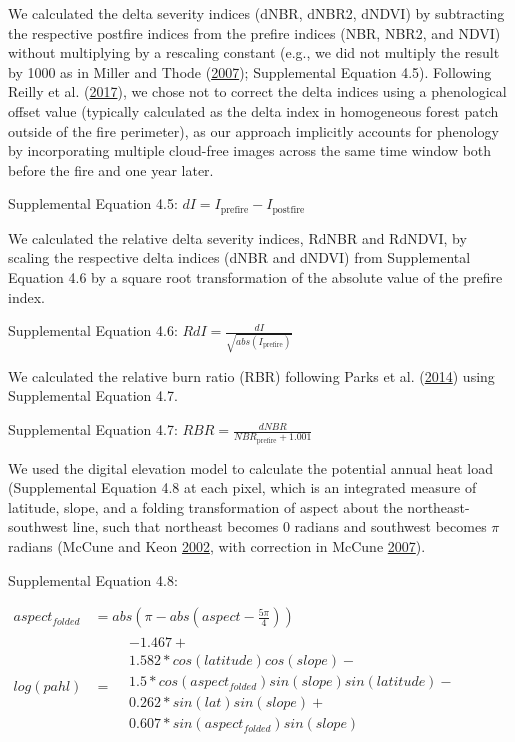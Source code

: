 \documentclass[twoside,12pt,final]{ucthesis-CA2012}
\begin{document}
\begin{ucmainmatter}
We calculated the delta severity indices (dNBR, dNBR2, dNDVI) by
subtracting the respective postfire indices from the prefire indices
(NBR, NBR2, and NDVI) without multiplying by a rescaling constant (e.g.,
we did not multiply the result by 1000 as in Miller and Thode
(\protect\hyperlink{ref-miller2007}{2007}); Supplemental Equation 4.5).
Following Reilly et al. (\protect\hyperlink{ref-reilly2017}{2017}), we
chose not to correct the delta indices using a phenological offset value
(typically calculated as the delta index in homogeneous forest patch
outside of the fire perimeter), as our approach implicitly accounts for
phenology by incorporating multiple cloud-free images across the same
time window both before the fire and one year later.

Supplemental Equation 4.5:
\(dI = I_{\text{prefire}} - I_{\text{postfire}}\)

We calculated the relative delta severity indices, RdNBR and RdNDVI, by
scaling the respective delta indices (dNBR and dNDVI) from Supplemental
Equation 4.6 by a square root transformation of the absolute value of
the prefire index.

Supplemental Equation 4.6:
\(RdI = \frac{dI}{\sqrt{abs(I_{\text{prefire}})}}\)

We calculated the relative burn ratio (RBR) following Parks et al.
(\protect\hyperlink{ref-parks2014a}{2014}) using Supplemental Equation
4.7.

Supplemental Equation 4.7:
\(RBR = \frac{dNBR}{NBR_{\text{prefire}} + 1.001}\)

We used the digital elevation model to calculate the potential annual
heat load (Supplemental Equation 4.8 at each pixel, which is an
integrated measure of latitude, slope, and a folding transformation of
aspect about the northeast-southwest line, such that northeast becomes 0
radians and southwest becomes \(\pi\) radians (McCune and Keon
\protect\hyperlink{ref-mccune2002}{2002}, with correction in McCune
\protect\hyperlink{ref-mccune2007}{2007}).

Supplemental Equation 4.8:

\(\begin{aligned} \label{eq-potential-annual-heat-load} aspect_{folded} &= abs( \pi - abs( aspect - \frac{5\pi}{4}) ) \\ log(pahl) &= \begin{aligned} &-1.467 + \\ &1.582 * cos(latitude) cos(slope) - \\ &1.5 * cos(aspect_{folded}) sin(slope) sin(latitude) - \\ &0.262 * sin(lat) sin(slope) + \\ &0.607 * sin(aspect_{folded}) sin(slope) \\ \end{aligned} \end{aligned}\)


\end{ucmainmatter}
\end{document}

